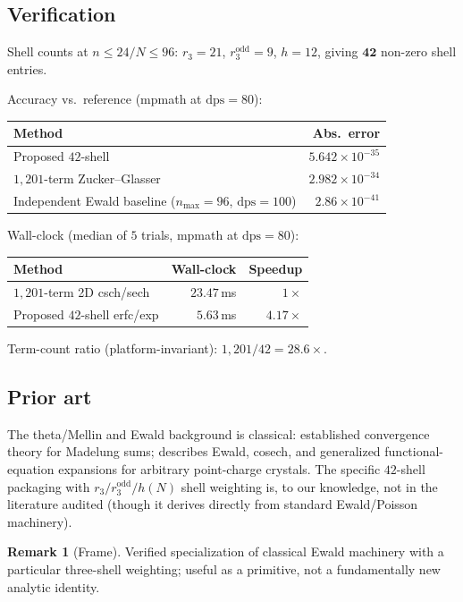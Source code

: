 \documentclass[11pt,reqno]{amsart}
\theoremstyle{definition}
\newtheorem{remark}[theorem]{Remark}
\newcommand{\dps}{\mathrm{dps}}
\begin{document}
\subsection{Verification}
Shell counts at $n \le 24 / N \le 96$: $r_3 = 21$,
$r_3^{\mathrm{odd}} = 9$, $h = 12$, giving $\mathbf{42}$ non-zero shell
entries.

Accuracy vs.\ reference (mpmath at $\dps = 80$):
\begin{center}
\begin{tabular}{lr}
\toprule
Method & Abs.\ error \\
\midrule
Proposed $42$-shell & $5.642 \times 10^{-35}$ \\
$1{,}201$-term Zucker--Glasser & $2.982 \times 10^{-34}$ \\
Independent Ewald baseline ($n_{\max} = 96$, $\dps = 100$) & $2.86 \times 10^{-41}$ \\
\bottomrule
\end{tabular}
\end{center}

Wall-clock (median of $5$ trials, mpmath at $\dps = 80$):
\begin{center}
\begin{tabular}{lrr}
\toprule
Method & Wall-clock & Speedup \\
\midrule
$1{,}201$-term 2D csch/sech & $23.47$\,ms & $1\times$ \\
Proposed $42$-shell erfc/exp & $5.63$\,ms & $\mathbf{4.17\times}$ \\
\bottomrule
\end{tabular}
\end{center}
Term-count ratio (platform-invariant): $1{,}201 / 42 = 28.6\times$.

\subsection{Prior art}
The theta/Mellin and Ewald background is classical:
\cite{BorweinBorweinTaylor1985} established convergence theory for
Madelung sums; \cite{CrandallBuhler1987} describes Ewald, cosech, and
generalized functional-equation expansions for arbitrary point-charge
crystals. The specific $42$-shell packaging with
$r_3 / r_3^{\mathrm{odd}} / h(N)$ shell weighting is, to our knowledge,
not in the literature audited (though it derives directly from standard
Ewald/Poisson machinery).

\begin{remark}[Frame]
Verified specialization of classical Ewald machinery with a particular
three-shell weighting; useful as a primitive, not a fundamentally new
analytic identity.
\end{remark}
\end{document}
